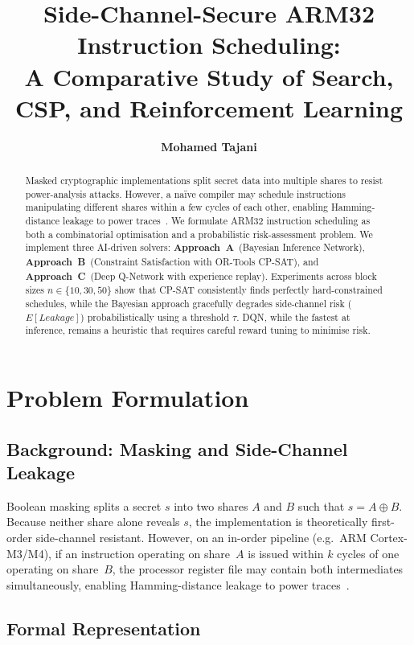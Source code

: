 \documentclass[letterpaper]{article}
\title{Side-Channel-Secure ARM32 Instruction Scheduling:\\
A Comparative Study of Search, CSP, and Reinforcement Learning}
\author{
  \textbf{Mohamed Tajani}
}
\begin{document}
\maketitle

\begin{abstract}
  Masked cryptographic implementations split secret data into multiple
  shares to resist power-analysis attacks.  However, a na\"ive compiler
  may schedule instructions manipulating different shares within a few
  cycles of each other, enabling Hamming-distance leakage to power
  traces~\cite{kocher1999}.  We formulate ARM32
  instruction scheduling as both a combinatorial optimisation
  and a probabilistic risk-assessment problem. We implement
  three AI-driven solvers: \textbf{Approach~A}~(Bayesian Inference Network),
  \textbf{Approach~B}~(Constraint Satisfaction with OR-Tools CP-SAT), and
  \textbf{Approach~C}~(Deep Q-Network with experience replay).
  Experiments across block sizes $n \in \{10, 30, 50\}$ show that CP-SAT
  consistently finds perfectly hard-constrained schedules, while the Bayesian
  approach gracefully degrades side-channel risk ($E[Leakage]$) probabilistically
  using a threshold $\tau$. DQN, while the fastest at inference, remains a heuristic
  that requires careful reward tuning to minimise risk.
\end{abstract}

\section{Problem Formulation}
\label{sec:problem}

\subsection{Background: Masking and Side-Channel Leakage}

Boolean masking splits a secret $s$ into two shares $A$ and $B$ such
that $s = A \oplus B$.  Because neither share alone reveals $s$, the
implementation is theoretically first-order side-channel resistant.
However, on an in-order pipeline (e.g.\ ARM Cortex-M3/M4), if an
instruction operating on share~$A$ is issued within $k$ cycles of one
operating on share~$B$, the processor register file may contain both
intermediates simultaneously, enabling Hamming-distance leakage to power
traces~\cite{kocher1999}.

\subsection{Formal Representation}
\end{document}
